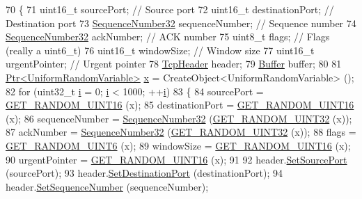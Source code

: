 \begin{DoxyCode}
70 \{
71   uint16\_t sourcePort;        \textcolor{comment}{// Source port}
72   uint16\_t destinationPort;   \textcolor{comment}{// Destination port}
73   \hyperlink{classns3_1_1SequenceNumber}{SequenceNumber32} sequenceNumber;  \textcolor{comment}{// Sequence number}
74   \hyperlink{classns3_1_1SequenceNumber}{SequenceNumber32} ackNumber;       \textcolor{comment}{// ACK number}
75   uint8\_t flags;              \textcolor{comment}{// Flags (really a uint6\_t)}
76   uint16\_t windowSize;        \textcolor{comment}{// Window size}
77   uint16\_t urgentPointer;     \textcolor{comment}{// Urgent pointer}
78   \hyperlink{classns3_1_1TcpHeader}{TcpHeader} header;
79   \hyperlink{classns3_1_1Buffer}{Buffer} buffer;
80 
81   \hyperlink{classns3_1_1Ptr}{Ptr<UniformRandomVariable>} \hyperlink{lte__link__budget__x2__handover__measures_8m_a9336ebf25087d91c818ee6e9ec29f8c1}{x} = CreateObject<UniformRandomVariable> ();
82   \textcolor{keywordflow}{for} (uint32\_t \hyperlink{bernuolliDistribution_8m_a6f6ccfcf58b31cb6412107d9d5281426}{i} = 0; \hyperlink{bernuolliDistribution_8m_a6f6ccfcf58b31cb6412107d9d5281426}{i} < 1000; ++\hyperlink{bernuolliDistribution_8m_a6f6ccfcf58b31cb6412107d9d5281426}{i})
83     \{
84       sourcePort = \hyperlink{tcp-header-test_8cc_a5ad9b850834e357fa799fbd61fdae700}{GET\_RANDOM\_UINT16} (x);
85       destinationPort = \hyperlink{tcp-header-test_8cc_a5ad9b850834e357fa799fbd61fdae700}{GET\_RANDOM\_UINT16} (x);
86       sequenceNumber = \hyperlink{group__network_gacb2070e4e98d2d5135c9bede58f07a03}{SequenceNumber32} (\hyperlink{tcp-header-test_8cc_a18a01a3931e95a479db69a3aa5ecb86b}{GET\_RANDOM\_UINT32} (x));
87       ackNumber = \hyperlink{group__network_gacb2070e4e98d2d5135c9bede58f07a03}{SequenceNumber32} (\hyperlink{tcp-header-test_8cc_a18a01a3931e95a479db69a3aa5ecb86b}{GET\_RANDOM\_UINT32} (x));
88       flags = \hyperlink{tcp-header-test_8cc_a238b3bcc0c1ee2f728a775153422d52a}{GET\_RANDOM\_UINT6} (x);
89       windowSize = \hyperlink{tcp-header-test_8cc_a5ad9b850834e357fa799fbd61fdae700}{GET\_RANDOM\_UINT16} (x);
90       urgentPointer = \hyperlink{tcp-header-test_8cc_a5ad9b850834e357fa799fbd61fdae700}{GET\_RANDOM\_UINT16} (x);
91 
92       header.\hyperlink{classns3_1_1TcpHeader_aceb2630b3d43118ee576aec58f55a0ff}{SetSourcePort} (sourcePort);
93       header.\hyperlink{classns3_1_1TcpHeader_a3259c06373ba4261eaaaed0cbf40cad3}{SetDestinationPort} (destinationPort);
94       header.\hyperlink{classns3_1_1TcpHeader_a3483eb1604d7db47b1163b02f74bcc25}{SetSequenceNumber} (sequenceNumber);

\end{DoxyCode}

